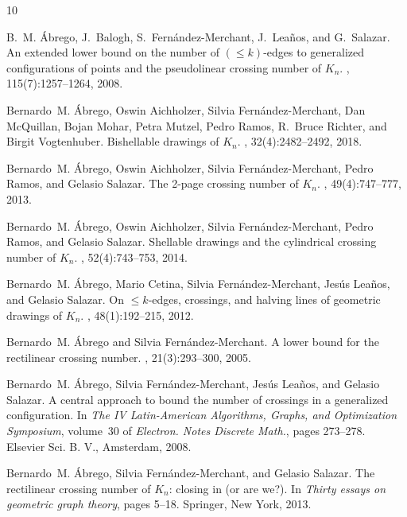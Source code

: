 \documentclass[11pt]{article}
\renewcommand{\leq}{\leqslant}
\begin{document}
\begin{thebibliography}{10}

B.~M. \'{A}brego, J.~Balogh, S.~Fern\'{a}ndez-Merchant, J.~Lea\~{n}os, and
  G.~Salazar.
\newblock An extended lower bound on the number of {$(\leq k)$}-edges to
  generalized configurations of points and the pseudolinear crossing number of
  {$K_n$}.
, 115(7):1257--1264, 2008.

Bernardo~M. \'{A}brego, Oswin Aichholzer, Silvia Fern\'{a}ndez-Merchant, Dan
  McQuillan, Bojan Mohar, Petra Mutzel, Pedro Ramos, R.~Bruce Richter, and
  Birgit Vogtenhuber.
\newblock Bishellable drawings of {$K_n$}.
, 32(4):2482--2492, 2018.

Bernardo~M. \'{A}brego, Oswin Aichholzer, Silvia Fern\'{a}ndez-Merchant, Pedro
  Ramos, and Gelasio Salazar.
\newblock The 2-page crossing number of {$K_n$}.
, 49(4):747--777, 2013.

Bernardo~M. \'{A}brego, Oswin Aichholzer, Silvia Fern\'{a}ndez-Merchant, Pedro
  Ramos, and Gelasio Salazar.
\newblock Shellable drawings and the cylindrical crossing number of {$K_n$}.
, 52(4):743--753, 2014.

Bernardo~M. \'{A}brego, Mario Cetina, Silvia Fern\'{a}ndez-Merchant, Jes\'{u}s
  Lea\~{n}os, and Gelasio Salazar.
\newblock On {$\leq k$}-edges, crossings, and halving lines of geometric
  drawings of {$K_n$}.
, 48(1):192--215, 2012.

Bernardo~M. \'{A}brego and Silvia Fern\'{a}ndez-Merchant.
\newblock A lower bound for the rectilinear crossing number.
, 21(3):293--300, 2005.

Bernardo~M. \'{A}brego, Silvia Fern\'{a}ndez-Merchant, Jes\'{u}s Lea\~{n}os,
  and Gelasio Salazar.
\newblock A central approach to bound the number of crossings in a generalized
  configuration.
\newblock In {\em The {IV} {L}atin-{A}merican {A}lgorithms, {G}raphs, and
  {O}ptimization {S}ymposium}, volume~30 of {\em Electron. Notes Discrete
  Math.}, pages 273--278. Elsevier Sci. B. V., Amsterdam, 2008.

Bernardo~M. \'{A}brego, Silvia Fern\'{a}ndez-Merchant, and Gelasio Salazar.
\newblock The rectilinear crossing number of {$K_n$}: closing in (or are we?).
\newblock In {\em Thirty essays on geometric graph theory}, pages 5--18.
  Springer, New York, 2013.


\end{thebibliography}
\end{document}

